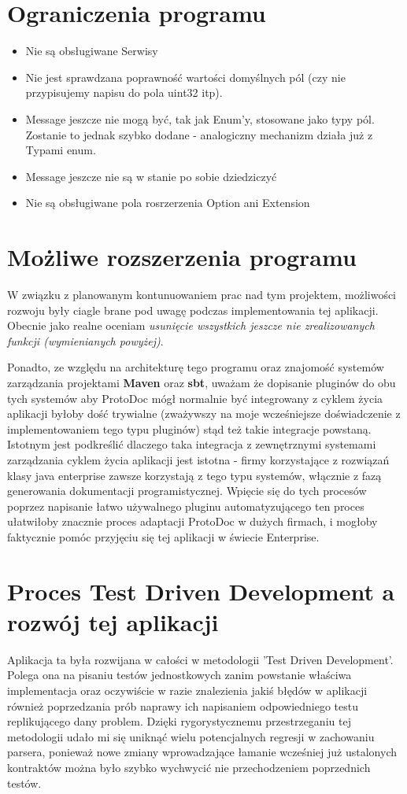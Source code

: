 \documentclass[a4paper]{article}
\begin{document}
\newpage
\section{Ograniczenia programu}
\begin{itemize}
 \item Nie są obsługiwane Serwisy 
 \item Nie jest sprawdzana poprawność wartości domyślnych pól (czy nie przypisujemy napisu do pola uint32 itp).
 \item Message jeszcze nie mogą być, tak jak Enum'y, stosowane jako typy pól. Zostanie to jednak szybko dodane - analogiczny mechanizm działa już z Typami enum.
 \item Message jeszcze nie są w stanie po sobie dziedziczyć
 \item Nie są obsługiwane pola rosrzerzenia Option ani Extension
\end{itemize}

\newpage
\section{Możliwe rozszerzenia programu}
W związku z planowanym kontunuowaniem prac nad tym projektem, możliwości rozwoju były ciagle brane pod uwagę
podczas implementowania tej aplikacji. Obecnie jako realne oceniam \textit{usunięcie wszystkich jeszcze nie zrealizowanych funkcji 
(wymienianych powyżej)}. 

Ponadto, ze względu na architekturę tego programu oraz znajomość systemów zarządzania projektami \textbf{Maven} oraz \textbf{sbt},
uważam że dopisanie pluginów do obu tych systemów aby ProtoDoc mógł normalnie być integrowany z cyklem życia aplikacji byłoby dość trywialne 
(zważywszy na moje wcześniejsze doświadczenie z implementowaniem tego typu pluginów) stąd też takie integracje powstaną. Istotnym jest podkreślić dlaczego
taka integracja z zewnętrznymi systemami zarządzania cyklem życia aplikacji jest istotna - firmy korzystające z rozwiązań klasy java enterprise zawsze 
korzystają z tego typu systemów, włącznie z fazą generowania dokumentacji programistycznej. Wpięcie się do tych procesów poprzez napisanie łatwo używalnego
pluginu automatyzującego ten proces ułatwiłoby znacznie proces adaptacji ProtoDoc w dużych firmach, i mogłoby faktycznie pomóc przyjęciu się tej aplikacji w świecie Enterprise.

\newpage
\section{Proces Test Driven Development a rozwój tej aplikacji}
Aplikacja ta była rozwijana w całości w metodologii 'Test Driven Development'. Polega ona na pisaniu testów jednostkowych
zanim powstanie właściwa implementacja oraz oczywiście w razie znalezienia jakiś błędów w aplikacji również poprzedzania prób 
naprawy ich napisaniem odpowiedniego testu replikującego dany problem. Dzięki rygorystycznemu przestrzeganiu tej metodologii
udało mi się uniknąć wielu potencjalnych regresji w zachowaniu parsera, ponieważ nowe zmiany wprowadzające łamanie wcześniej 
już ustalonych kontraktów można było szybko wychwycić nie przechodzeniem poprzednich testów. 
\end{document}
